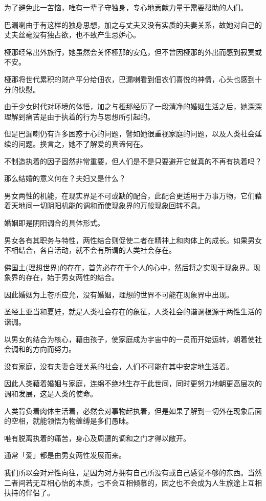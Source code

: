 \documentclass[twoside,openany]{book}
\begin{document}
为了避免此一苦恼，唯有一辈子守独身，专心地贡献力量于需要帮助的人们。

巴漏喇由于有这样的独身思想，加之与丈夫又没有实质的夫妻关系，故她对自己的丈夫丝毫没有独占欲，也不致产生忌妒心。

桠那经常出外旅行，她虽然会关怀桠那的安危，但不曾因桠那的外出而感到寂寞或不安。

桠那将世代累积的财产平分给佃农，巴漏喇看到佃农们喜悦的神倩，心头也感到十分的快慰。

由于少女时代对环境的体悟，加之与桠那经历了一段清净的婚姻生活之后，她深深理解到痛苦是由于执着的行为与思想所引起的。

但是巴漏喇仍有许多困惑于心的问题，譬如她很重视家庭的问题，以及人类社会延续的问题。换言之，她不了解爱的真谛何在。

不制造执着的因子固然非常重要，但人们是不是只要避开它就真的不再有执着吗？

那么结婚的意义何在？夫妇又是什么？

男女两性的机能，在现实界是不可或缺的配合，此配合更适用于万事万物，它们藉着天地间一切阴阳机能的调和而使现象界的万般现象回转不息。

婚姻即是阴阳调合的具体形式。

男女各有其职务与特性，两性结合则促使二者在精神上和肉体上的成长。如果男女不相结合，各自活动，就不会有所谓的人类社会存在。

佛国土(理想世界)的存在，首先必存在于个人的心中，然后将之实现于现象界。现象界的存在，始于男女两性的结合。

因此婚姻为上苍所应允，没有婚姻，理想的世界不可能在现象界中出现。

圣经上亚当和夏娃，就是人类社会存在的象征，人类社会的谐调根源于两性生活的谐调。

以男女的结合为核心，藉由孩子，使家庭成为宇宙中的一员而开始运转，朝着使社会调和的方向而努力。

没有家庭，没有夫妻合理关系的社会，人们不可能在其中安定地生活着。

因此人类藉着婚姻与家庭，连绵不绝地生存于此世间，同时更努力地朝更高层次的调和发展，这是人类的使命。

人类背负着肉体生活着，必然会对事物起执着，但是如果了解到一切外在现象后面的空相，就能领悟为物缠缚是多们愚昧。

唯有脱离执着的痛苦，身心及周遭的调和之门才得以敞开。

通常「爱」都是由男女两性发展而来。

我们所以会对异性向往，是因为对方拥有自己所没有或自己感觉不够的东西。当然二者间若无互相心怡的本质，也不会互相倾慕的，因之也不会成为人生旅途上互相扶持的伴侣了。
\end{document}
